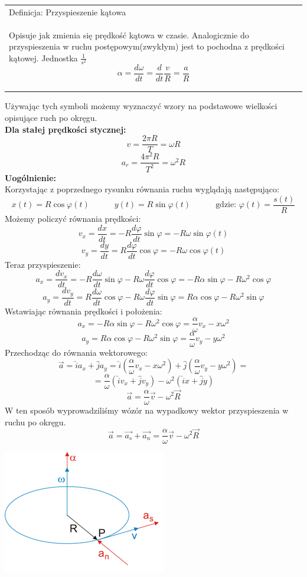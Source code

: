\documentclass[a4paper]{article}
\newenvironment{definition}[2][Definicja]
    {
        \begin{center}
        \begin{tabular}{|p{1\textwidth}|}
        \hline
            #1: #2\\[2ex]
        \begin{em}
        \Large
    }
    { 
        \end{em}
        \\\hline
        \end{tabular} 
        \end{center}
    }
\begin{document}
    \begin{definition}{Przyspieszenie kątowa}
        Opisuje jak zmienia się prędkość kątowa w czasie. Analogicznie do przyspieszenia w ruchu
        postępowym(zwykłym) jest to pochodna z prędkości kątowej. Jednostka $\frac{1}{s^2}$
        \[\alpha = \frac{d \omega}{dt} = \frac{d}{dt}\frac{v}{R} = \frac{a}{R} \]
    \end{definition}
    Używając tych symboli możemy wyznaczyć wzory na podstawowe wielkości opisujące ruch po okręgu.\\
    \textbf{Dla stałej prędkości stycznej:}    
    \[v = \frac{2\pi R}{T} = \omega R\]
    \[a_r = \frac{4\pi^2 R}{T^2} = \omega^2 R\]
    \textbf{Uogólnienie:}\\
    Korzystając z poprzednego rysunku równania ruchu wyglądają następująco:
    \[x(t) = R\cos \varphi(t) \quad\qquad y(t) = R\sin \varphi(t) \quad\qquad \text{gdzie: } \varphi(t) = \frac{s(t)}{R}\]
    Możemy policzyć równania prędkości:
    \[v_x = \frac{dx}{dt} = -R \frac{d\varphi}{dt}\sin \varphi = -R \omega \sin \varphi(t) \]
    \[v_y = \frac{dy}{dt} = R \frac{d\varphi}{dt}\cos \varphi = -R \omega \cos \varphi(t) \]
    Teraz przyspieszenie:
    \[a_x = \frac{d v_x}{dt} = -R \frac{d \omega}{dt} \sin \varphi - R\omega \frac{d \varphi}{dt} \cos \varphi = 
    -R\alpha \sin \varphi - R\omega^2\cos \varphi \]
    \[a_y = \frac{d v_y}{dt} = R \frac{d \omega}{dt} \cos \varphi - R\omega \frac{d \varphi}{dt} \sin \varphi = 
    R\alpha \cos \varphi - R\omega^2\sin \varphi \]
    Wstawiając równania prędkości i położenia:
    \[a_x = -R\alpha \sin \varphi - R\omega^2\cos \varphi = \frac{\alpha}{\omega}v_x - x\omega^2\]
    \[a_y = R\alpha \cos \varphi - R\omega^2\sin \varphi = \frac{\alpha}{\omega}v_y - y\omega^2\]
    Przechodząc do równania wektorowego:
    \[\vec{a} = \hat{i}a_x + \hat{j}a_y = \hat{i} \left(\frac{\alpha}{\omega}v_x - x\omega^2 \right) 
    + \hat{j} \left(  \frac{\alpha}{\omega}v_y - y\omega^2 \right) = \]
    \[= \frac{\alpha}{\omega} \left( \hat{i}v_x + \hat{j}v_y \right) - \omega^2\left( \hat{i}x + \hat{j}y \right) \]
    \[\vec{a} = \frac{\alpha}{\omega}\vec{v} -\omega^2\vec{R}\]
    W ten sposób wyprowadziliśmy wózór na wypadkowy wektor przyspieszenia w ruchu po okręgu.
    \[\vec{a} = \vec{a_s} + \vec{a_n} = \frac{\alpha}{\omega}\vec{v} -\omega^2\vec{R}\]
    \begin{center}
        \includegraphics{img/ruchokrag3.png}
    \end{center}
\end{document}
